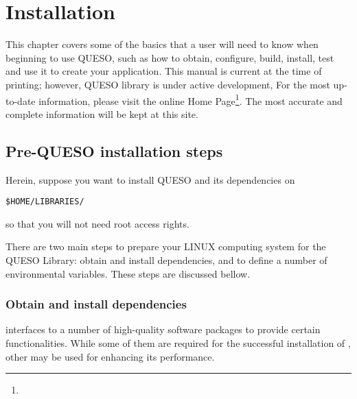 \chapter{Installation}\label{ch-install}
\thispagestyle{headings}


  
This chapter covers some of the basics that a user will need to know when beginning to use QUESO, such as 
how to obtain, configure, build, install, test \Queso{} and use it to create your application.  This manual is current at the time of
printing; however, QUESO library  is under active development, For the most up-to-date information,
please visit the online \Queso{} Home Page\footnote{\Quesoweb}. The most accurate and complete information will be kept at this site.



        
\section{Pre-QUESO installation steps}\label{sec:Pre_Queso}


Herein, suppose you want to install QUESO and its dependencies on 
\begin{lstlisting}
$HOME/LIBRARIES/
\end{lstlisting}
%
so that you will not need root access rights. 

There are two main steps to prepare your LINUX computing system  for  the QUESO Library: obtain and install \Queso{} dependencies, and to define a number of environmental variables. These steps are discussed bellow.


\subsection{Obtain and install \Queso{} dependencies}

\Queso{} interfaces to a number of high-quality software packages to provide certain functionalities. While some of them are required for the successful installation of \Queso{}, other may be used for enhancing its performance. 

